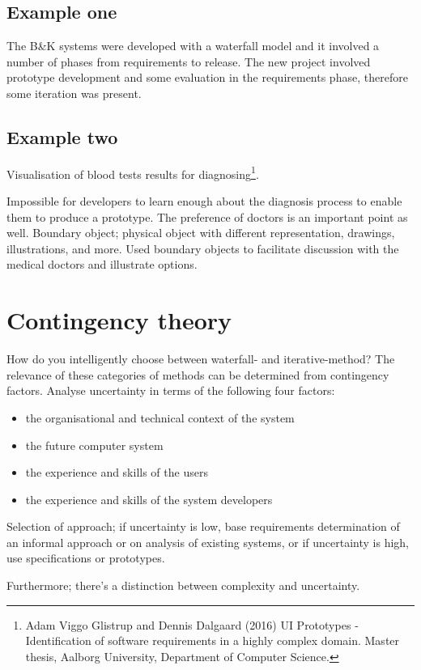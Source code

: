 \subsection{Example one}
The B\&K systems were developed with a waterfall model and it involved a number of phases from requirements to release. The new project involved prototype development and some evaluation in the requirements phase, therefore some iteration was present.

\subsection{Example two}
Visualisation of blood tests results for diagnosing\footnote{Adam Viggo Glistrup and Dennis Dalgaard (2016) UI Prototypes ‐ Identification of software requirements in a highly complex domain. Master thesis, Aalborg University, Department of Computer Science.}.

Impossible for developers to learn enough about the diagnosis process to enable them to produce a prototype. The preference of doctors is an important point as well. Boundary object; physical object with different representation, drawings, illustrations, and more. Used boundary objects to facilitate discussion with the medical doctors and illustrate options.

\section{Contingency theory}
How do you intelligently choose between waterfall- and iterative-method? The relevance of these categories of methods can be determined from contingency factors. Analyse uncertainty in terms of the following four factors:

\begin{itemize}
    \item the organisational and technical context of the system
    \item the future computer system
    \item the experience and skills of the users
    \item the experience and skills of the system developers
\end{itemize}

Selection of approach; if uncertainty is low, base requirements determination of an informal approach or on analysis of existing systems, or if uncertainty is high, use specifications or prototypes. 

Furthermore; there's a distinction between complexity and uncertainty.

